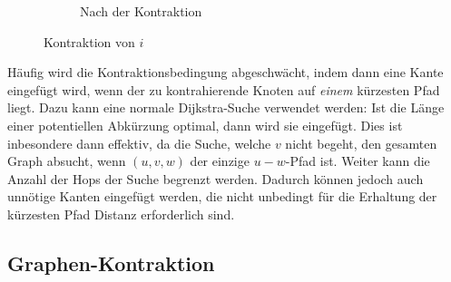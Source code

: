\begin{figure}[ht]
\begin{subfigure}[b]{0.49\textwidth}
{
        }
        \caption{Nach der Kontraktion}
    \end{subfigure}
    \caption{Kontraktion von $i$}
    \label{graphs:fig:example_contraction}
\end{figure}

Häufig wird die Kontraktionsbedingung abgeschwächt, indem dann eine Kante eingefügt wird, wenn der zu kontrahierende Knoten auf \emph{einem} kürzesten Pfad liegt.
Dazu kann eine normale Dijkstra-Suche verwendet werden: Ist die Länge einer potentiellen Abkürzung optimal, dann wird sie eingefügt.
Dies ist inbesondere dann effektiv, da die Suche, welche $v$ nicht begeht, den gesamten Graph absucht, wenn $(u, v, w)$ der einzige $u-w$-Pfad ist.
Weiter kann die Anzahl der Hops der Suche begrenzt werden.
Dadurch können jedoch auch unnötige Kanten eingefügt werden, die nicht unbedingt für die Erhaltung der kürzesten Pfad Distanz erforderlich sind.

\subsection{Graphen-Kontraktion}

